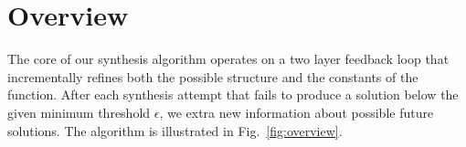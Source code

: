 \section{Overview}

The core of our synthesis algorithm operates on a two layer feedback loop that incrementally refines both the possible structure and the constants of the function.
After each synthesis attempt that fails to produce a solution below the given minimum threshold $\epsilon$, we extra new information about possible future solutions.
The algorithm is illustrated in Fig.~\ref{fig:overview}.



